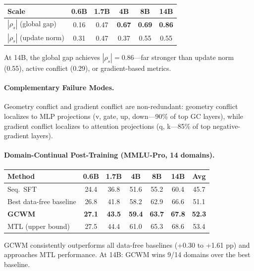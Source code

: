 \documentclass[11pt]{article}
\begin{document}
\begin{center}
\begin{tabular}{lccccc}
\toprule
\textbf{Scale} & 0.6B & 1.7B & 4B & 8B & 14B \\
\midrule
$|\rho_s|$ (global gap) & 0.16 & 0.47 & \textbf{0.67} & \textbf{0.69} & \textbf{0.86} \\
$|\rho_s|$ (update norm) & 0.31 & 0.47 & 0.37 & 0.55 & 0.55 \\
\bottomrule
\end{tabular}
\end{center}

At 14B, the global gap achieves $|\rho_s| = 0.86$---far stronger than update norm (0.55), active conflict (0.29), or gradient-based metrics.

\paragraph{Complementary Failure Modes.}
Geometry conflict and gradient conflict are non-redundant: geometry conflict localizes to MLP projections (v, gate, up, down---90\% of top GC layers), while gradient conflict localizes to attention projections (q, k---85\% of top negative-gradient layers).

\paragraph{Domain-Continual Post-Training (MMLU-Pro, 14 domains).}

\begin{center}
\begin{tabular}{lcccccc}
\toprule
\textbf{Method} & \textbf{0.6B} & \textbf{1.7B} & \textbf{4B} & \textbf{8B} & \textbf{14B} & \textbf{Avg} \\
\midrule
Seq.\ SFT & 24.4 & 36.8 & 51.6 & 55.2 & 60.4 & 45.7 \\
Best data-free baseline & 26.8 & 41.8 & 58.2 & 62.9 & 66.6 & 51.1 \\
\textbf{GCWM} & \textbf{27.1} & \textbf{43.5} & \textbf{59.4} & \textbf{63.7} & \textbf{67.8} & \textbf{52.3} \\
MTL (upper bound) & 27.5 & 44.4 & 61.0 & 65.3 & 68.6 & 53.4 \\
\bottomrule
\end{tabular}
\end{center}

GCWM consistently outperforms all data-free baselines (+0.30 to +1.61 pp) and approaches MTL performance. At 14B: GCWM wins 9/14 domains over the best baseline.
\end{document}

